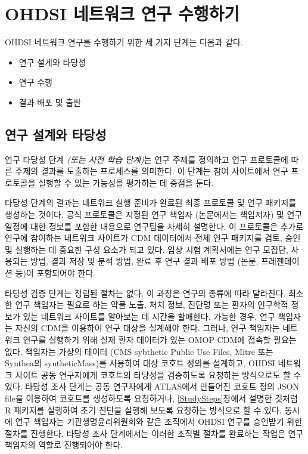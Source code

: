 \documentclass[10.5pt]{book}
\providecommand{\tightlist}{%
  \setlength{\itemsep}{0pt}\setlength{\parskip}{0pt}}
\theoremstyle{definition}
\theoremstyle{definition}
\theoremstyle{definition}
\theoremstyle{remark}
\begin{document}
\section{OHDSI 네트워크 연구 수행하기}\label{ohdsi---}


OHDSI 네트워크 연구를 수행하기 위한 세 가지 단계는 다음과 같다.

\begin{itemize}
\tightlist
\item
  연구 설계와 타당성
\item
  연구 수행
\item
  결과 배포 및 출판
\end{itemize}

\subsection{연구 설계와 타당성}\label{--}

연구 타당성 단계 \emph{(또는 사전 학습 단계)}는 연구 주제를 정의하고
연구 프로토콜에 따른 주제의 결과를 도출하는 프로세스를 의미한다. 이
단계는 참여 사이트에서 연구 프로토콜을 실행할 수 있는 가능성을 평가하는
데 중점을 둔다.

타당성 단계의 결과는 네트워크 실행 준비가 완료된 최종 프로토콜 및 연구
패키지를 생성하는 것이다. 공식 프로토콜은 지정된 연구 책임자 (논문에서는
책임저자) 및 연구 일정에 대한 정보를 포함한 내용으로 연구팀을 자세히
설명한다. 이 프로토콜은 추가로 연구에 참여하는 네트워크 사이트가 CDM
데이터에서 전체 연구 패키지를 검토, 승인 및 실행하는 데 중요한 구성
요소가 되고 있다. 임상 시험 계획서에는 연구 모집단, 사용되는 방법, 결과
저장 및 분석 방법, 완료 후 연구 결과 배포 방법 (논문, 프레젠테이션 등)이
포함되어야 한다.

타당성 검증 단계는 정립된 절차는 없다. 이 과정은 연구의 종류에 따라
달라진다. 최소한 연구 책임자는 필요로 하는 약물 노출, 처치 정보, 진단명
또는 환자의 인구학적 정보가 있는 네트워크 사이트를 알아보는 데 시간을
할애한다. 가능한 경우, 연구 책임자는 자신의 CDM을 이용하여 연구 대상을
설계해야 한다. 그러나, 연구 책임자는 네트워크 연구를 실행하기 위해 실제
환자 데이터가 있는 OMOP CDM에 접속할 필요는 없다. 책임자는 가상의 데이터
(CMS sybthetic Public Use Files, Mitre 또는 Synthea의 syntheticMass)를
사용하여 대상 코호트 정의를 설계하고, OHDSI 네트워크 사이트 공동
연구자에게 코호트의 타당성을 검증하도록 요청하는 방식으로도 할 수 있다.
타당성 조사 단계는 공동 연구자에게 ATLAS에서 만들어진 코호트 정의 JSON
file을 이용하여 코호트를 생성하도록 요청하거나, \ref{StudySteps}장에서
설명한 것처럼 R 패키지를 실행하여 초기 진단을 실행해 보도록 요청하는
방식으로 할 수 있다. 동시에 연구 책임자는 기관생명윤리위원회와 같은
조직에서 OHDSI 연구를 승인받기 위한 절차를 진행한다. 타당성 조사
단계에서는 이러한 조직별 절차를 완료하는 작업은 연구 책임자의 역할로
진행되어야 한다.
\end{document}
